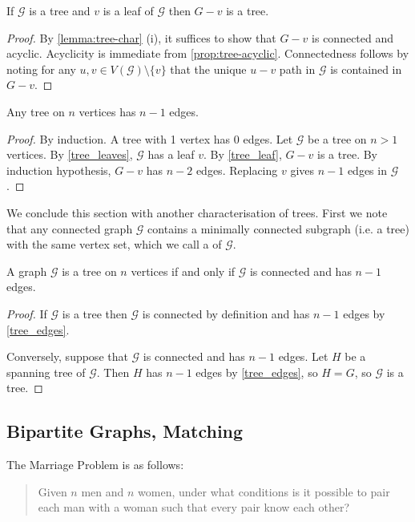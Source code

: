 \begin{lemma}\label{tree_leaf}
If $\mathcal{G}$ is a tree and $v$ is a leaf of $\mathcal{G}$ then $G-v$ is a tree.
\end{lemma}
\begin{proof}
By \cref{lemma:tree-char} (i), it suffices to show that $G-v$ is connected and acyclic. Acyclicity is immediate from \cref{prop:tree-acyclic}. Connectedness follows by noting for any $u,v \in V(\mathcal{G})\setminus\{v\}$ that the unique $u-v$ path in $\mathcal{G}$ is contained in $G-v$.
\end{proof}

\begin{lemma}\label{tree_edges}
Any tree on $n$ vertices has $n-1$ edges.
\end{lemma}
\begin{proof}
By induction. A tree with 1 vertex has 0 edges. Let $\mathcal{G}$ be a tree on $n>1$ vertices. By \cref{tree_leaves}, $\mathcal{G}$ has a leaf $v$. By \cref{tree_leaf}, $G-v$ is a tree. By induction hypothesis, $G-v$ has $n-2$ edges. Replacing $v$ gives $n-1$ edges in $\mathcal{G}$.
\end{proof}

We conclude this section with another characterisation of trees. First we note that any connected graph $\mathcal{G}$ contains a minimally connected subgraph (i.e. a tree) with the same vertex set, which we call a  of $\mathcal{G}$.

\begin{lemma}
A graph $\mathcal{G}$ is a tree on $n$ vertices if and only if $\mathcal{G}$ is connected and has $n-1$ edges.
\end{lemma}

\begin{proof}
If $\mathcal{G}$ is a tree then $\mathcal{G}$ is connected by definition and has $n-1$ edges by \cref{tree_edges}. 

Conversely, suppose that $\mathcal{G}$ is connected and has $n-1$ edges. Let $H$ be a spanning tree of $\mathcal{G}$. Then $H$ has $n-1$ edges by \cref{tree_edges}, so $H = G$, so $\mathcal{G}$ is a tree.
\end{proof}

\subsection{Bipartite Graphs, Matching}
The Marriage Problem is as follows:

\begin{quote}
Given $n$ men and $n$ women, under what conditions is it possible to pair each man with a woman such that every pair know each other?
\end{quote}

